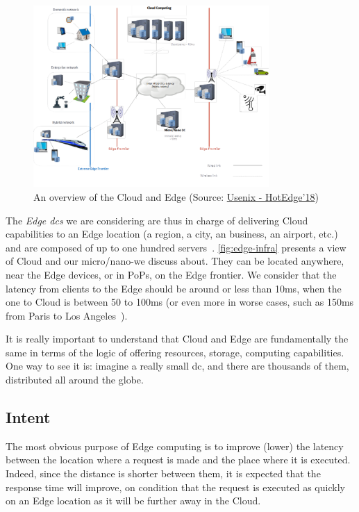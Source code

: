 \begin{figure}
  \centering
  \includegraphics[width=0.8\textwidth]{figs/pdf/edge-infra}
  \caption{An overview of the Cloud and Edge (Source: \href{https://www.usenix.org/sites/default/files/conference/protected-files/hotedge18_slides_cherrueau.pdf}{Usenix - HotEdge'18})}
  \label{fig:edge-infra}
\end{figure}


The \emph{Edge \glspl{dc}} we are considering are thus in charge of
delivering Cloud capabilities to an Edge location (\ie a region, a
city, an business, an airport, etc.) and are composed of up to one
hundred \glspl{server}~\cite{CDL21}.
%
\autoref{fig:edge-infra} presents a view of Cloud \dcs and our
micro/nano-\dcs we discuss about.
%
They can be located anywhere, near the Edge devices, or in
\acrshort{PoP}s, on the Edge frontier.
%
We consider that the latency from clients to the Edge \dcs should be
around or less than 10ms, when the one to Cloud \dcs is between 50 to
100ms (or even more in worse cases, such as 150ms from Paris to Los
Angeles~\cite{pings}).

It is really important to understand that Cloud and Edge are
fundamentally the same in terms of the logic of offering resources,
storage, computing capabilities.
%
One way to see it is: imagine a really small \gls{dc}, and there
are thousands of them, distributed all around the globe.
%



\subsection{Intent}

The most obvious purpose of Edge computing is to improve (lower) the
latency between the location where a request is made and the place
where it is executed.
%
Indeed, since the distance is shorter between them, it is expected
that the response time will improve, on condition that the request is
executed as quickly on an Edge location as it will be further away in
the Cloud.

